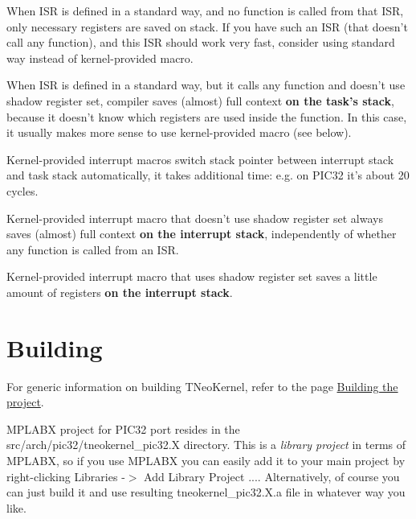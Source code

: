 \begin{DoxyItemize}
\item When I\+S\+R is defined in a standard way, and no function is called from that I\+S\+R, only necessary registers are saved on stack. If you have such an I\+S\+R (that doesn't call any function), and this I\+S\+R should work very fast, consider using standard way instead of kernel-\/provided macro.
\item When I\+S\+R is defined in a standard way, but it calls any function and doesn't use shadow register set, compiler saves (almost) full context {\bfseries on the task's stack}, because it doesn't know which registers are used inside the function. In this case, it usually makes more sense to use kernel-\/provided macro (see below).
\item Kernel-\/provided interrupt macros switch stack pointer between interrupt stack and task stack automatically, it takes additional time\+: e.\+g. on P\+I\+C32 it's about 20 cycles.
\item Kernel-\/provided interrupt macro that doesn't use shadow register set always saves (almost) full context {\bfseries on the interrupt stack}, independently of whether any function is called from an I\+S\+R.
\item Kernel-\/provided interrupt macro that uses shadow register set saves a little amount of registers {\bfseries on the interrupt stack}.
\end{DoxyItemize}\hypertarget{pic32_details_pic32_building}{}\section{Building}\label{pic32_details_pic32_building}
For generic information on building T\+Neo\+Kernel, refer to the page \hyperlink{building}{Building the project}.

M\+P\+L\+A\+B\+X project for P\+I\+C32 port resides in the {\ttfamily src/arch/pic32/tneokernel\+\_\+pic32.\+X} directory. This is a {\itshape library project} in terms of M\+P\+L\+A\+B\+X, so if you use M\+P\+L\+A\+B\+X you can easily add it to your main project by right-\/clicking {\ttfamily Libraries -\/$>$ Add Library Project ...}. Alternatively, of course you can just build it and use resulting {\ttfamily tneokernel\+\_\+pic32.\+X.\+a} file in whatever way you like. 
